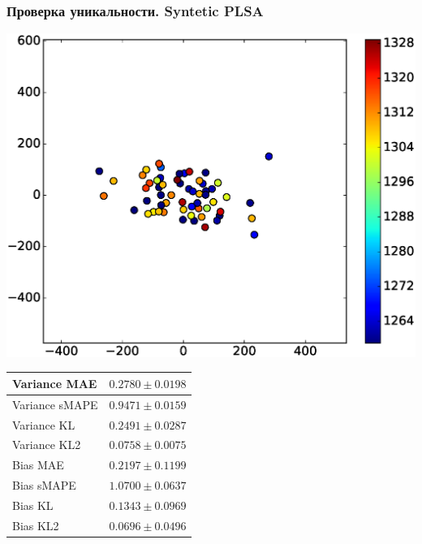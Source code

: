 \documentclass[utf8]{beamer}
\begin{document}
	
	\begin{frame}
	\fontsize{10pt}{9.2}\selectfont
	\frametitle{Проверка уникальности. Syntetic PLSA}
	 \includegraphics[width=0.45\linewidth]{presentation_pictures/syntetic_plsa.eps} 
    \begin{tabular}[b]{| l | l | }\hline
      Variance MAE & $0.2780 \pm 0.0198$ \\ \hline
      Variance sMAPE  & $0.9471 \pm 0.0159$ \\ \hline
      Variance KL  & $0.2491 \pm 0.0287$ \\ \hline
      Variance KL2  & $0.0758 \pm 0.0075$ \\ \hline

      Bias MAE & $0.2197 \pm 0.1199$ \\ \hline
      Bias sMAPE  & $1.0700 \pm 0.0637$ \\ \hline
      Bias KL  & $0.1343 \pm 0.0969$ \\ \hline
      Bias KL2  & $0.0696 \pm 0.0496$ \\ \hline
    \end{tabular}

	\end{frame}
	
\end{document}
